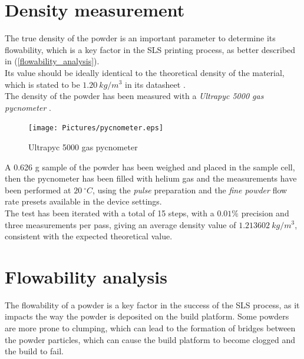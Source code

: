 \documentclass{article}
\begin{document}
    \clearpage

    \section{Density measurement\label{density_measurement}}

    The true density of the powder is an important parameter to determine its flowability, which is a key factor in the
    SLS printing process, as better described in (\ref{flowability_analysis}). \\
    
    Its value should be ideally identical to the theoretical density of the material, which is stated to be 
    $1.20 \ kg/m^3$ in its datasheet \autocites{GruppoMaip}. \\ 
    
    The density of the powder has been measured with a \textit{Ultrapyc 5000 gas
    pycnometer} \autocites{Ultrapyc5000}. \\ 

    \begin{figure}[h!]
        \centering
        \texttt{[image: Pictures/pycnometer.eps]}
        \caption{Ultrapyc 5000 gas pycnometer \autocites{Ultrapyc5000}}
        \label{fig:ultrapyc5000}
    \end{figure}

    A 0.626 g sample of the powder has been weighed and placed in the sample cell, then the pycnometer has been filled with 
    helium gas and the measurements have been performed at $20 \ ^{\circ}C$, using the \textit{pulse} preparation and the 
    \textit{fine powder} flow rate presets available in the device settings. \\ 

    The test has been iterated with a total of 15 steps, with a $0.01 \%$ precision and three measurements per pass, giving an average 
    density value of $1.213602 \ kg/m^3$, consistent with the expected theoretical value. \\ 

    \clearpage

    \section{Flowability analysis\label{flowability_analysis}}

    The flowability of a powder is a key factor in the success of the SLS process, as it impacts the way the powder is deposited
    on the build platform. Some powders are more prone to clumping, which can lead to the formation of bridges between the powder 
    particles, which can cause the build platform to become clogged and the build to fail. \\ 
\end{document}
